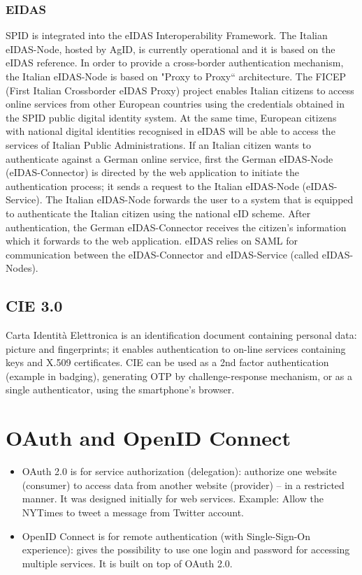 \documentclass[a4paper, 10pt, titlepage]{article}
\begin{document}
\subsubsection{EIDAS}
SPID is integrated into the eIDAS Interoperability Framework. The Italian eIDAS-Node, hosted by AgID, is currently operational and it is based on the eIDAS reference. In order to provide a cross-border authentication mechanism, the Italian eIDAS-Node is based on "Proxy to Proxy“ architecture. The FICEP (First Italian Crossborder eIDAS Proxy) project enables Italian citizens to access online services from other European countries using the credentials obtained in the SPID public digital identity system. At the same time, European citizens with national digital identities recognised in eIDAS will be able to access the services of Italian Public Administrations.
If an Italian citizen wants to authenticate against a German online service, first the German eIDAS-Node (eIDAS-Connector) is directed by the web application to initiate the authentication process; it sends a request to the Italian eIDAS-Node (eIDAS-Service). The Italian eIDAS-Node forwards the user to a system that is equipped to authenticate the Italian citizen using the national eID scheme. After authentication, the German eIDAS-Connector receives the citizen’s information which it forwards to the web application. 
eIDAS relies on SAML for communication between the eIDAS-Connector and eIDAS-Service (called eIDAS-Nodes).

\subsection{CIE 3.0}
Carta Identità Elettronica is an identification document containing personal data: picture and fingerprints; it enables authentication to on-line services containing keys and X.509 certificates. 
CIE can be used as a 2nd factor authentication (example in badging), generating OTP by challenge-response mechanism, or as a single authenticator, using the smartphone's browser.


\newpage
\section{OAuth and OpenID Connect}
\begin{itemize}
\item OAuth 2.0 is for service authorization (delegation): authorize one website (consumer) to access data from another website (provider) – in a restricted manner. It was designed initially for web services. Example: Allow the NYTimes to tweet a message from Twitter account.
\item OpenID Connect is for remote authentication (with Single-Sign-On experience): gives the possibility to use one login and password for accessing multiple services. It is built on top of OAuth 2.0.
\end{itemize}
\end{document}
